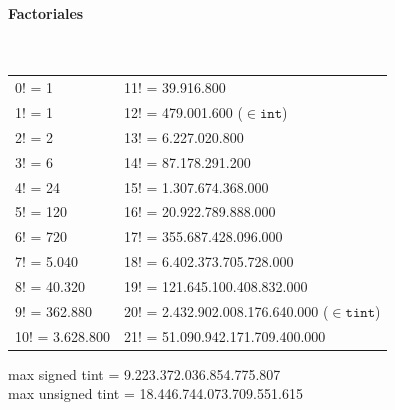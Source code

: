 \paragraph{Factoriales} \ \\
\begin{tabular}{l|l}
0! =	1             & 11! = 39.916.800  \\
1! =	1             & 12! =	479.001.600	($\in \mathtt{int}$)\\
2! =	2             & 13! =	6.227.020.800	\\
3! =	6             & 14! =	87.178.291.200	\\
4! =	24            & 15! =	1.307.674.368.000	\\
5! =	120   			  & 16! =	20.922.789.888.000	\\
6! =	720           & 17! =	355.687.428.096.000	\\
7! =	5.040	        & 18! =	6.402.373.705.728.000	\\
8! =	40.320	      & 19! =	121.645.100.408.832.000	\\
9! =	362.880       & 20! =	2.432.902.008.176.640.000	($\in \mathtt{tint}$) \\
10! =	3.628.800     & 21! =	51.090.942.171.709.400.000
\end{tabular}

max signed tint = 9.223.372.036.854.775.807 \\
max unsigned tint = 18.446.744.073.709.551.615
